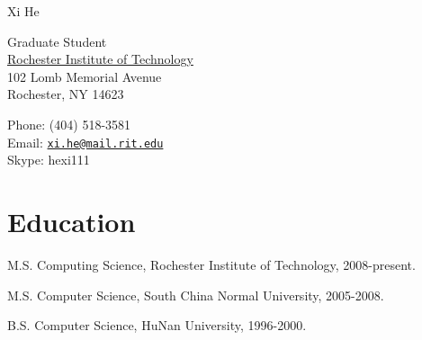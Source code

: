 \documentclass[10pt,letterpaper]{article}
\def\name{Xi He}
\renewenvironment{itemize}{
  \begin{list}{}{
    \setlength{\leftmargin}{1.5em}
  }
}{
  \end{list}
}
\begin{document}
{\huge \name}


\vspace{0.25in}

\begin{minipage}[t]{0.5\textwidth}
  {Graduate Student}\\
  \href{http://www.rit.edu/}{Rochester Institute of Technology} \\
 102 Lomb Memorial Avenue\\
  Rochester, NY  14623  \\
\end{minipage}
\begin{minipage}[t]{0.5\textwidth}
  Phone: (404) 518-3581 \\
  Email: \href{mailto:xi.he@mail.rit.edu}{\tt xi.he@mail.rit.edu} \\
  Skype: hexi111
\end{minipage}

\section*{Education}

\begin{itemize}
  \item M.S. Computing Science, Rochester Institute of Technology,  2008-present.

  \item M.S. Computer Science, South China Normal University, 2005-2008.

  \item B.S. Computer Science, HuNan University, 1996-2000.

\end{itemize}
\end{document}
